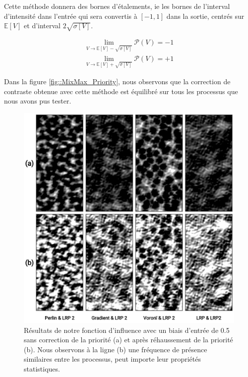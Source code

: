 \documentclass[9pt, twocolumn]{article} %
\begin{document}
Cette méthode donnera des bornes d'étalements, ie les bornes de l'interval
d'intensité dans l'entrée qui sera convertis à $[-1, 1]$ dans la sortie,
centrés sur $\mathbb{E}[V]$ et d'interval $2\sqrt{\sigma[V]}$.

\begin{equation}\label{PriorityBornes2}
  \begin{split}
    \lim_{V \rightarrow \mathbb{E}[V] - \sqrt{\sigma[V]}}\mathcal{P}(V) = -1
    \\
    \lim_{V \rightarrow \mathbb{E}[V] + \sqrt{\sigma[V]}}\mathcal{P}(V) = +1
  \end{split}
\end{equation}

Dans la figure \ref{fig::MixMax_Priority}, nous observons que la correction de
contraste obtenue avec cette méthode est équilibré sur tous les processus que
nous avons pus tester.

\begin{figure}
  \includegraphics[width=\linewidth]{figures/MixMax_PriorityCorrection.png}
  \caption{
    Résultats de notre fonction d'influence avec un biais d'entrée de 0.5 sans correction de la priorité (a) et après réhaussement de la priorité (b). Nous observons à la ligne (b) une fréquence de présence similaires entre les processus, peut importe leur propriétés statistiques.
  }
  \label{fig::MixMax_PriorityCorrection}
\end{figure}
\end{document}
